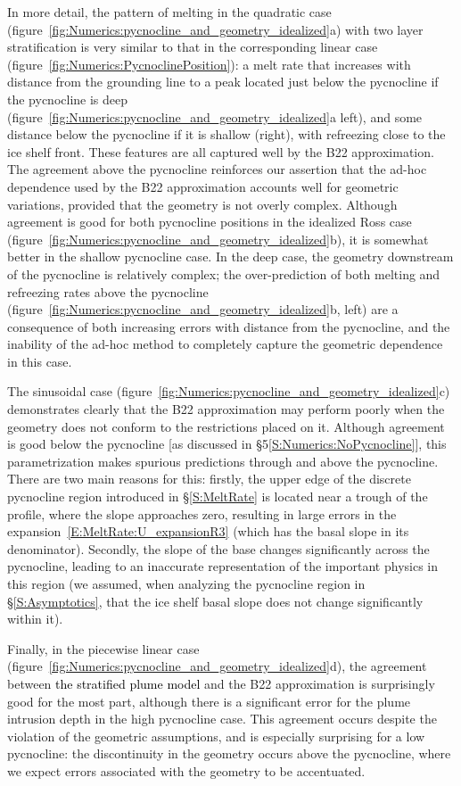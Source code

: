 \documentclass[openacc]{rsproca_new}%
\newcommand{\red}[1]{{\color{red} #1}}
\newcommand{\blue}[1]{{\color{blue} #1}}
\newcommand{\rout}[1]{\red{\st{#1}}}\newcommand{\ab}[1]{\textcolor{Green}{#1}}\newcommand{\about}[1]{\textcolor{Cyan}{\sout{#1}}}
\renewcommand{\rout}[1]{{}} %
\renewcommand{\blue}[1]{{\textcolor{black}{#1}}} %
\renewcommand{\red}[1]{{}} %
\begin{document}
In more detail, the pattern of melting in the quadratic case (figure~\ref{fig:Numerics:pycnocline_and_geometry_idealized}a) with two layer stratification is very similar to that in the corresponding linear case (figure~\ref{fig:Numerics:PycnoclinePosition}): a melt rate that increases with distance from the grounding line to a peak located just below the pycnocline if the pycnocline is deep (figure~\ref{fig:Numerics:pycnocline_and_geometry_idealized}a left), and some distance below the pycnocline if it is shallow (right), with refreezing close to the ice shelf front. These features are all captured well by the B22 approximation. The agreement above the pycnocline reinforces our assertion that the ad-hoc dependence used by the B22 approximation accounts well for geometric variations, provided that the geometry is not overly complex. Although agreement is good for both pycnocline positions in the idealized Ross case (figure~\ref{fig:Numerics:pycnocline_and_geometry_idealized}b), it is somewhat better in the shallow pycnocline case. In the deep case, the geometry downstream of the pycnocline is relatively complex; the over-prediction of both melting and refreezing rates above the pycnocline (figure~\ref{fig:Numerics:pycnocline_and_geometry_idealized}b, left) are a consequence of both increasing errors with distance from the pycnocline, and the inability of the ad-hoc method to completely capture the geometric dependence in this case. 

The sinusoidal case (figure~\ref{fig:Numerics:pycnocline_and_geometry_idealized}c) demonstrates clearly that the B22 approximation may perform poorly when the geometry does not conform to the restrictions placed on it. Although agreement is good below the pycnocline [as discussed in \S5\ref{S:Numerics:NoPycnocline}], this parametrization makes spurious predictions through and above the pycnocline. There are two main reasons for this: firstly, the upper edge of the discrete pycnocline region introduced in \S\ref{S:MeltRate} is located near a trough of the profile, where the slope approaches zero, resulting in large errors in the expansion~\eqref{E:MeltRate:U_expansionR3} (which has the basal slope in its denominator).  Secondly, the slope of the base changes significantly across the pycnocline, leading to an inaccurate representation of the important physics in this region (we assumed, when analyzing the pycnocline region in \S\ref{S:Asymptotics}, that the ice shelf basal slope does not change significantly within it).

Finally, in the piecewise linear case (figure~\ref{fig:Numerics:pycnocline_and_geometry_idealized}d), the agreement between \blue{the stratified plume model}\rout{numerical solutions} and the B22 approximation is surprisingly good for the most part, although there is a significant error for the plume intrusion depth in the high pycnocline case. This agreement occurs despite the violation of the geometric assumptions, and is especially surprising for a low pycnocline: the discontinuity in the geometry occurs above the pycnocline, where we expect errors associated with the geometry to be accentuated. 
\end{document}
